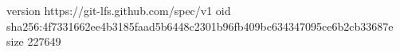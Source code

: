 version https://git-lfs.github.com/spec/v1
oid sha256:4f7331662ee4b3185faad5b6448c2301b96fb409bc634347095ce6b2cb33687e
size 227649
